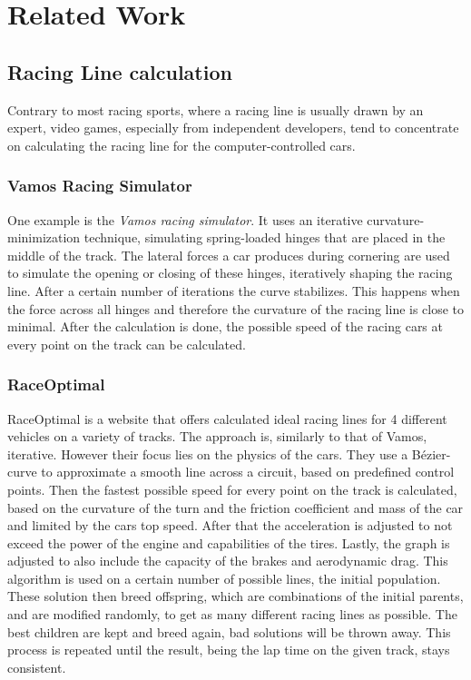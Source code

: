 \section{Related Work}
\label{sec:related_work}

\subsection{Racing Line calculation}
Contrary to most racing sports, where a racing line is usually drawn by an expert, video games, especially from independent developers, tend to concentrate on calculating the racing line for the computer-controlled cars.

\subsubsection{Vamos Racing Simulator}
One example is the \textit{Vamos racing simulator}. It uses an iterative cur\-va\-ture-min\-i\-mi\-za\-tion technique, simulating spring-loaded hinges that are placed in the middle of the track. The lateral forces a car produces during cornering are used to simulate the opening or closing of these hinges, iteratively shaping the racing line. After a certain number of iterations the curve stabilizes. This happens when the force across all hinges and therefore the curvature of the racing line is close to minimal. After the calculation is done, the possible speed of the racing cars at every point on the track can be calculated. 

\subsubsection{RaceOptimal}
RaceOptimal is a website that offers calculated ideal racing lines for 4 different vehicles on a variety of tracks. The approach is, similarly to that of Vamos, iterative. However their focus lies on the physics of the cars. They use a Bézier-curve to approximate a smooth line across a circuit, based on predefined control points. Then the fastest possible speed for every point on the track is calculated, based on the curvature of the turn and the friction coefficient and mass of the car and limited by the cars top speed. After that the acceleration is adjusted to not exceed the power of the engine and capabilities of the tires. Lastly, the graph is adjusted to also include the capacity of the brakes and aerodynamic drag. 
This algorithm is used on a certain number of possible lines, the initial population. These solution then breed offspring, which are combinations of the initial parents, and are modified randomly, to get as many different racing lines as possible.
The best children are kept and breed again, bad solutions will be thrown away. This process is repeated until the result, being the lap time on the given track, stays consistent.

